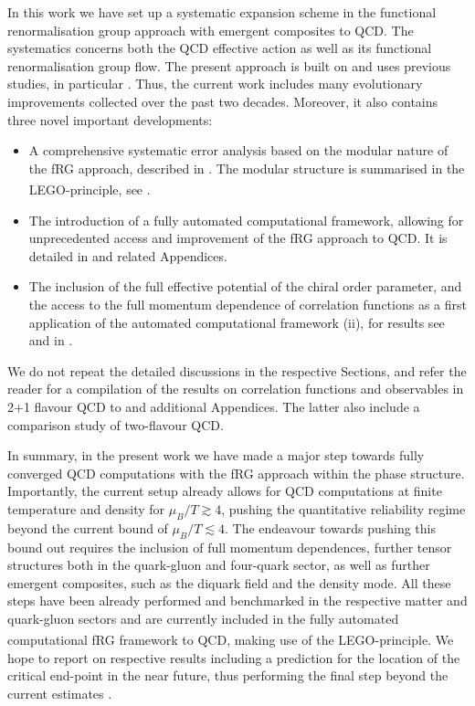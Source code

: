 \documentclass[aps,twocolumn,prd,superscriptaddress]{revtex4-2}
\newcommand{\LEGO}{LEGO\textsuperscript{\textregistered}}
\begin{document}
In this work we have set up a systematic expansion scheme in the functional renormalisation group approach with emergent composites to QCD. The systematics concerns both the QCD effective action as well as its functional renormalisation group flow. The present approach is built on and uses previous studies, in particular \cite{Gies:2002hq, Pawlowski:2003hq, Braun:2008pi, Braun:2009gm, Mitter:2014wpa, Braun:2014ata, Rennecke:2015eba, Cyrol:2016tym, Cyrol:2017ewj, Cyrol:2017qkl, Corell:2018yil, Fu:2019hdw, Braun:2020ada}. Thus, the current work includes many evolutionary improvements collected over the past two decades. Moreover, it also contains three novel important developments: 
%
\begin{itemize} 
\item[(i)] A comprehensive systematic error analysis based on the modular nature of the fRG approach, described in . The modular structure is summarised in the \LEGO-principle, see . 
\item[(ii)] The introduction of a fully automated computational framework, allowing for unprecedented access and improvement of the fRG approach to QCD. It is detailed in  and related Appendices. 
\item[(iii)] The inclusion of the full effective potential of the chiral order parameter, and the access to the full momentum dependence of correlation functions as a first application of the automated computational framework (ii), for results see  and  in . 
\end{itemize} 
%
We do not repeat the detailed discussions in the respective Sections, and refer the reader for a compilation of the results on correlation functions and observables in 2+1 flavour QCD to  and additional Appendices. The latter also include a comparison study of two-flavour QCD. 

In summary, in the present work we have made a major step towards fully converged QCD computations with the fRG approach within the phase structure. Importantly, the current setup already allows for QCD computations at finite temperature and density for $\mu_B/T\gtrsim 4$, pushing the quantitative reliability regime beyond the current bound of $\mu_B/T\lesssim 4$.
The endeavour towards pushing this bound out requires the inclusion of full momentum dependences, further tensor structures both in the quark-gluon and four-quark sector, as well as further emergent composites, such as the diquark field and the density mode. All these steps have been already performed and benchmarked in the respective matter and quark-gluon sectors and are currently included in the fully automated computational fRG framework to QCD, making use of the \LEGO-principle. We hope to report on respective results including a prediction for the location of the critical end-point in the near future, thus performing the final step beyond the current estimates \cite{Fu:2019hdw, Gao:2020fbl, Gunkel:2021oya}. 
\end{document}

